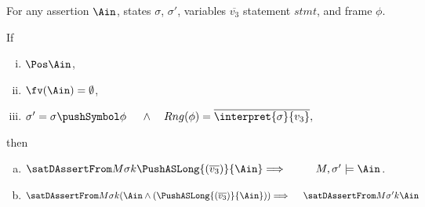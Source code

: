 \begin{lemma}
\label{l:calls:external}

For any assertion $\Ain$, states $\sigma$, $\sigma'$,  
variables   $\overline{v_3}$  
statement $stmt$, and frame $\phi$.

\noindent
If 
\begin{enumerate}[(i)]
\item 
\label{l:calls:ext:re:one}
$ \Pos \Ain$,  
\item 
\label{l:callsext:re:two}
$\fv(\Ain) =  \emptyset$,
\item
\label{l:calls:ext:re:three}
$\sigma'=\sigma  \pushSymbol \phi  \ \ \ \  \wedge\ \ \  Rng(\phi)= \overline{\interpret {\sigma} {v_3} },$
\end{enumerate}

\noindent
then

\begin{enumerate}[a.]
\item
\label{l:calls:callee:three}
$ \satDAssertFrom M  \sigma k    {\PushASLong  {(\overline {v_3})} {\Ain} }  \hfill \Longrightarrow  \ \ \  \   \ \ \  \   M, \sigma' \models   {\Ain} $.
 
\item
\label{l:calls:callee:four}
$\satDAssertFrom M  \sigma k    {(\Ain  \wedge  ({\PushASLong  {(\overline {v_3})} {\Ain} } ) )}    \hfill \Longrightarrow  \ \ \  \   \satDAssertFrom M  {\sigma'} k  {\Ain}$

\end{enumerate}

\end{lemma}

